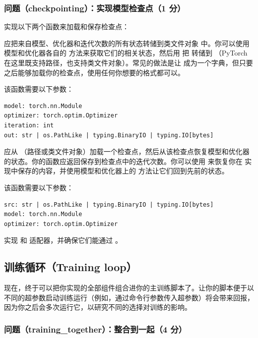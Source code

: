 \subsubsection*{问题（checkpointing）：实现模型检查点（1 分）}

实现以下两个函数来加载和保存检查点：

 应把来自模型、优化器和迭代次数的所有状态转储到类文件对象  中。你可以使用模型和优化器各自的  方法来获取它们的相关状态，然后用  把  转储到 （PyTorch 在这里既支持路径，也支持类文件对象）。常见的做法是让  成为一个字典，但只要之后能够加载你的检查点，使用任何你想要的格式都可以。

该函数需要以下参数：
\begin{lstlisting}
model: torch.nn.Module
optimizer: torch.optim.Optimizer
iteration: int
out: str | os.PathLike | typing.BinaryIO | typing.IO[bytes]
\end{lstlisting}

 应从 （路径或类文件对象）加载一个检查点，然后从该检查点恢复模型和优化器的状态。你的函数应返回保存到检查点中的迭代次数。你可以使用  来恢复你在  实现中保存的内容，并使用模型和优化器上的  方法让它们回到先前的状态。

该函数需要以下参数：
\begin{lstlisting}
src: str | os.PathLike | typing.BinaryIO | typing.IO[bytes]
model: torch.nn.Module
optimizer: torch.optim.Optimizer
\end{lstlisting}

实现  和  适配器，并确保它们能通过 。

\subsection{训练循环（Training loop）}

现在，终于可以把你实现的全部组件组合进你的主训练脚本了。让你的脚本便于以不同的超参数启动训练运行（例如，通过命令行参数传入超参数）将会带来回报，因为你之后会多次运行它，以研究不同的选择对训练的影响。

\subsubsection*{问题（training\_together）：整合到一起（4 分）}

